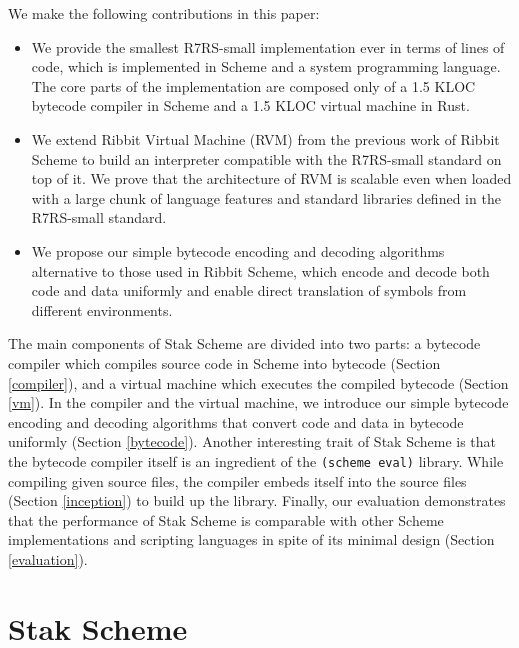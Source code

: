 \documentclass[sigplan, anonymous, review]{acmart}
\begin{document}
We make the following contributions in this paper:

\begin{itemize}
  \item We provide the smallest R7RS-small implementation ever in
    terms of lines of code, which is implemented
    in Scheme and a system programming language.
    The core parts of the implementation are composed only of a 1.5
    KLOC bytecode
    compiler in Scheme and a 1.5 KLOC virtual machine in Rust.
  \item We extend Ribbit Virtual Machine (RVM) from the previous
    work of Ribbit Scheme to build an interpreter compatible with the
    R7RS-small standard on top of it.
    We prove that the architecture of RVM is scalable even when
    loaded with a large chunk of language features and standard
    libraries defined in the R7RS-small standard.
  \item We propose our simple bytecode encoding and decoding algorithms
    alternative to those used in Ribbit Scheme, which encode and
    decode both code and data uniformly and enable direct translation
    of symbols from different environments.
\end{itemize}

The main components of Stak Scheme are divided into two parts:
a bytecode compiler which compiles source code in Scheme into
bytecode (Section \ref{compiler}),
and a virtual machine which executes the compiled bytecode
(Section \ref{vm}).
In the compiler and the virtual machine, we introduce our simple
bytecode encoding and
decoding algorithms that convert code and data in bytecode
uniformly (Section \ref{bytecode}).
Another interesting trait of Stak Scheme is that the bytecode compiler itself
is an ingredient of the \texttt{(scheme eval)} library.
While compiling given source files, the compiler embeds itself
into the source files (Section \ref{inception}) to build up the library.
Finally, our evaluation demonstrates that the performance of Stak Scheme is
comparable with other Scheme implementations and scripting
languages in spite of its minimal design (Section \ref{evaluation}).

\section{Stak Scheme}
\end{document}
